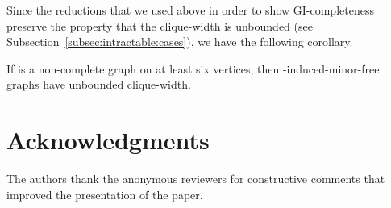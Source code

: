 \documentclass[envcountsame,envcountsect,11pt,a4paper]{llncs}
\begin{document}
Since the reductions that we used above in order to show GI-completeness preserve
the property that the clique-width is unbounded (see Subsection~\ref{subsec:intractable:cases}), we have the following corollary.
\begin{corollary}
If  is a non-complete graph on at least six vertices,
then -induced-minor-free graphs have unbounded clique-width.
\end{corollary}




\section*{Acknowledgments}
The authors thank the anonymous reviewers for constructive comments that improved the presentation of the paper.




\end{document}
